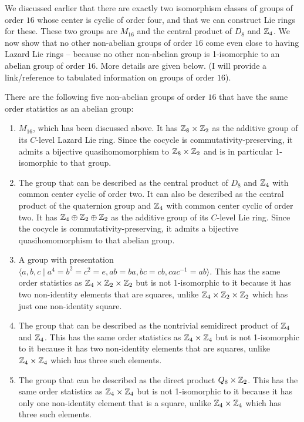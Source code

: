 \documentclass[10pt]{amsart}
\begin{document}
We discussed earlier that there are exactly two isomorphism classes of
groups of order $16$ whose center is cyclic of order four, and that we
can construct Lie rings for these. These two groups are $M_{16}$ and
the central product of $D_8$ and $\mathbb{Z}_4$. We now show that no other
non-abelian groups of order $16$ come even close to having Lazard Lie
rings -- because no other non-abelian group is 1-isomorphic to an
abelian group of order $16$. More details are given below. (I will
provide a link/reference to tabulated information on groups of order
$16$).

There are the following five non-abelian groups of order $16$ that
have the same order statistics as an abelian group:

\begin{enumerate}
\item $M_{16}$, which has been discussed above. It has $\mathbb{Z}_8 \times
  \mathbb{Z}_2$ as the additive group of its $C$-level Lazard Lie ring. Since
  the cocycle is commutativity-preserving, it admits a bijective
  quasihomomorphism to $\mathbb{Z}_8 \times \mathbb{Z}_2$ and is in particular
  1-isomorphic to that group.
\item The group that can be described as the central product of $D_8$
  and $\mathbb{Z}_4$ with common center cyclic of order two. It can also be
  described as the central product of the quaternion group and $\mathbb{Z}_4$
  with common center cyclic of order two. It has $\mathbb{Z}_4 \oplus \mathbb{Z}_2
  \oplus \mathbb{Z}_2$ as the additive group of its $C$-level Lie ring. Since
  the cocycle is commutativity-preserving, it admits a bijective
  quasihomomorphism to that abelian group.
\item A group with presentation $\langle a,b,c \mid a^4 = b^2 = c^2 =
  e, ab = ba, bc = cb, cac^{-1} = ab \rangle$. This has the same order
  statistics as $\mathbb{Z}_4 \times \mathbb{Z}_2 \times \mathbb{Z}_2$ but is not 1-isomorphic
  to it because it has two non-identity elements that are squares,
  unlike $\mathbb{Z}_4 \times \mathbb{Z}_2 \times \mathbb{Z}_2$ which has just one
  non-identity square.
\item The group that can be described as the nontrivial semidirect
  product of $\mathbb{Z}_4$ and $\mathbb{Z}_4$. This has the same order statistics as
  $\mathbb{Z}_4 \times \mathbb{Z}_4$ but is not 1-isomorphic to it because it has two
  non-identity elements that are squares, unlike $\mathbb{Z}_4 \times \mathbb{Z}_4$
  which has three such elements.
\item The group that can be described as the direct product $Q_8
  \times \mathbb{Z}_2$. This has the same order statistics as $\mathbb{Z}_4 \times
  \mathbb{Z}_4$ but is not 1-isomorphic to it because it has only one
  non-identity element that is a square, unlike $\mathbb{Z}_4 \times \mathbb{Z}_4$
  which has three such elements.
\end{enumerate}
\end{document}
